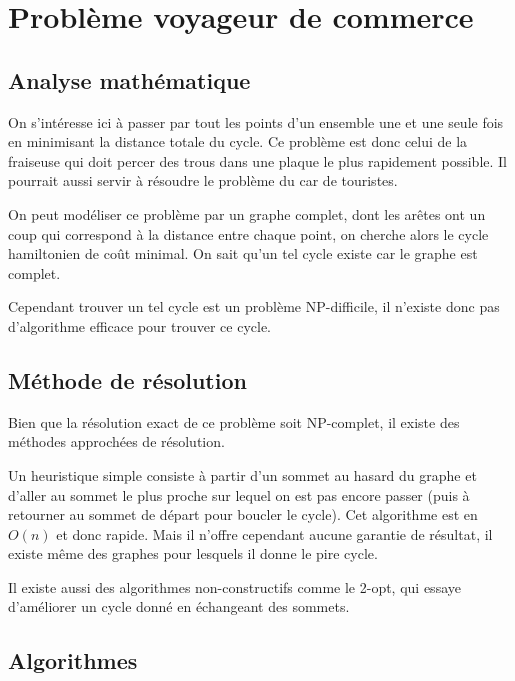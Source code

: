 \documentclass{scrartcl}
\begin{document}
\section{Problème voyageur de commerce} \label{sec:tsp}
  \subsection{Analyse mathématique}
    On s'intéresse ici à passer par tout les points d'un ensemble une et une
    seule fois en minimisant la distance totale du cycle. Ce problème est donc
    celui de la fraiseuse qui doit percer des trous dans une plaque le plus
    rapidement possible. Il pourrait aussi servir à résoudre le problème du car
    de touristes.

    On peut modéliser ce problème par un graphe complet, dont les arêtes ont un
    coup qui correspond à la distance entre chaque point, on cherche alors le
    cycle hamiltonien de coût minimal. On sait qu'un tel cycle existe car le
    graphe est complet.

    Cependant trouver un tel cycle est un problème NP-difficile, il n'existe
    donc pas d'algorithme efficace pour trouver ce cycle.

  \subsection{Méthode de résolution}
    Bien que la résolution exact de ce problème soit NP-complet, il existe des
    méthodes approchées de résolution.

    Un heuristique simple consiste à partir d'un sommet au hasard du graphe et
    d'aller au sommet le plus proche sur lequel on est pas encore passer (puis
    à retourner au sommet de départ pour boucler le cycle). Cet algorithme est
    en $O(n)$ et donc rapide. Mais il n'offre cependant aucune garantie de
    résultat, il existe même des graphes pour lesquels il donne le pire cycle.

    Il existe aussi des algorithmes non-constructifs comme le 2-opt, qui essaye
    d'améliorer un cycle donné en échangeant des sommets.


  \subsection{Algorithmes}
\end{document}
